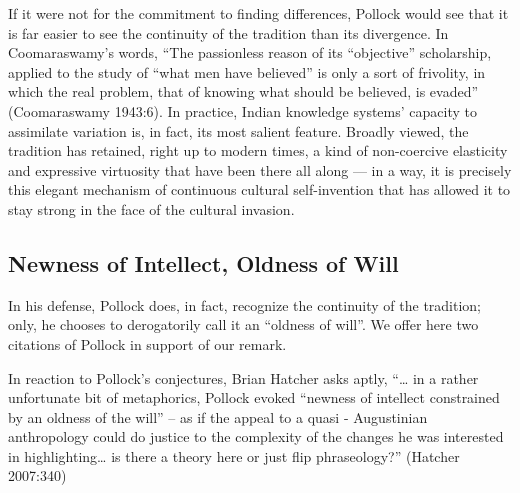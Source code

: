 If it were not for the commitment to finding differences, Pollock would see that it is far easier to see the continuity of the tradition than its divergence. In Coomaraswamy’s words, “The passionless reason of its “objective” scholarship, applied to the study of “what men have believed” is only a sort of frivolity, in which the real problem, that of knowing what should be believed, is evaded” (Coomaraswamy 1943:6). In practice, Indian knowledge systems’ capacity to assimilate variation is, in fact, its most salient feature. Broadly viewed, the tradition has retained, right up to modern times, a kind of non-coercive elasticity and expressive virtuosity that have been there all along — in a way, it is precisely this elegant mechanism of continuous cultural self-invention that has allowed it to stay strong in the face of the cultural invasion.\\[-20pt] 


\subsection{Newness of Intellect, Oldness of Will}%

In his defense, Pollock does, in fact, recognize the continuity of the tradition; only, he chooses to derogatorily call it an “oldness of will”. We offer here two citations of Pollock in support of our remark.
In reaction to Pollock’s conjectures, Brian Hatcher asks aptly, “… in a rather unfortunate bit of metaphorics, Pollock evoked “newness of intellect constrained by an oldness of the will” – as if the appeal to a quasi - Augustinian anthropology could do justice to the complexity of the changes he was interested in highlighting… is there a theory here or just flip phraseology?” (Hatcher 2007:340) 


